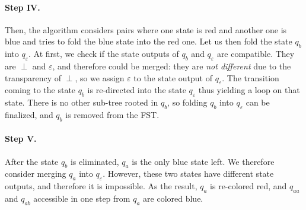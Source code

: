 \paragraph{Step IV.}

Then, the algorithm considers pairs where one state is red and another one is blue and tries to fold the blue state into the red one.
Let us then fold the state $q_b$ into $q_\varepsilon$.
At first, we check if the state outputs of $q_b$ and $q_\varepsilon$ are compatible.
They are $\perp$ and $\varepsilon$, and therefore could be merged: they are \emph{not different} due to the transparency of $\perp$, so we assign $\varepsilon$ to the state output of $q_\varepsilon$.
The transition coming to the state $q_b$ is re-directed into the state $q_\varepsilon$ thus yielding a loop on that state.
There is no other sub-tree rooted in $q_b$, so folding $q_b$ into $q_\varepsilon$ can be finalized, and $q_b$ is removed from the FST.

\begin{center}
\end{center}

\paragraph{Step V.}

After the state $q_b$ is eliminated, $q_a$ is the only blue state left.
We therefore consider merging $q_a$ into $q_\varepsilon$.
However, these two states have different state outputs, and therefore it is impossible.
As the result, $q_a$ is re-colored red, and $q_{aa}$ and $q_{ab}$ accessible in one step from $q_a$ are colored blue.


